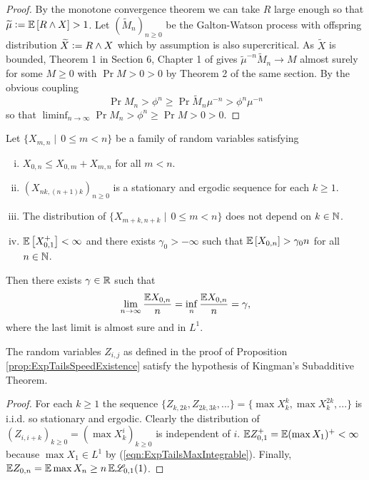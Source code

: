 \begin{proof}
By the monotone convergence theorem we can take $R$ large enough so that $\widetilde{\mu} \vcentcolon= \mathbb{E}\left[ R \land X \right] > 1$. Let $(\widetilde{M}_n)_{n \geq 0}$ be the Galton-Watson process with offspring distribution $\widetilde{X} \vcentcolon= R \land X$ which by assumption is also supercritical. As $\widetilde{X}$ is bounded, Theorem 1 in Section 6, Chapter 1 of \cite{athreya2004branching} gives $\widetilde{\mu}^{-n} \widetilde{M}_n \to M$ almost surely for some $M \geq 0$ with $\Pr{M > 0} > 0$ by Theorem 2 of the same section. By the obvious coupling 
\begin{equation}
\Pr{M_n > \phi^n} \geq \Pr{\widetilde{M}_n \mu^{-n} > \phi^n \mu^{-n}}
\end{equation} 
so that $\liminf_{n \to \infty} \Pr{M_n > \phi^n} \geq \Pr{M > 0} > 0$. 
\end{proof}

\begin{theorem}
Let $\{X_{m,n} \mid\, 0 \leq m < n\}$ be a family of random variables satisfying 
\begin{enumerate}[(i)]
\item $X_{0,n} \leq X_{0,m} + X_{m, n}$ for all $m < n$. 
\item $(X_{nk, (n+1)k})_{n \geq 0}$ is a stationary and ergodic sequence for each $k \geq 1$. 
\item The distribution of $\{X_{m + k, n + k} \mid\, 0 \leq m < n\}$ does not depend on $k \in \mathbb{N}$. 
\item $\mathbb{E}\left[ X_{0,1}^+ \right] < \infty$ and there exists $\gamma_0 > -\infty$ such that $\mathbb{E}\left[ X_{0,n} \right] > \gamma_0 n$ for all $n \in \mathbb{N}$. 
\end{enumerate}
Then there exists $\gamma \in \mathbb{R}$ such that 
\begin{equation}
\lim\limits_{n \to \infty} \frac{\mathbb{E} X_{0, n}}{n} = \inf\limits_{n} \frac{\mathbb{E} X_{0,n}}{n} = \gamma, 
\end{equation}
where the last limit is almost sure and in $L^1$. 
\end{theorem}

\begin{lemma}\label{lem:ExpTailsKingmanHolds}
The random variables $Z_{i,j}$ as defined in the proof of Proposition \ref{prop:ExpTailsSpeedExistence} satisfy the hypothesis of Kingman's Subadditive Theorem. 
\end{lemma}

\begin{proof}
For each $k \geq 1$ the sequence $\{Z_{k, 2k}, Z_{2k, 3k}, ...\} = \{\max X^k_k, \max X^{2k}_k, ... \}$ is i.i.d. so stationary and ergodic. Clearly the distribution of $(Z_{i, i + k})_{k \geq 0} = (\max X^i_k)_{k \geq 0}$ is independent of $i$. $\mathbb{E} Z^+_{0,1} = \mathbb{E} (\max X_1)^+ < \infty$ because $\max X_1 \in L^1$ by (\ref{eqn:ExpTailsMaxIntegrable}). Finally, $\mathbb{E} Z_{0, n} = \mathbb{E} \max X_n \geq n\, \mathbb{E} \mathscr{L}_{0,1}(1)$. 
\end{proof}

